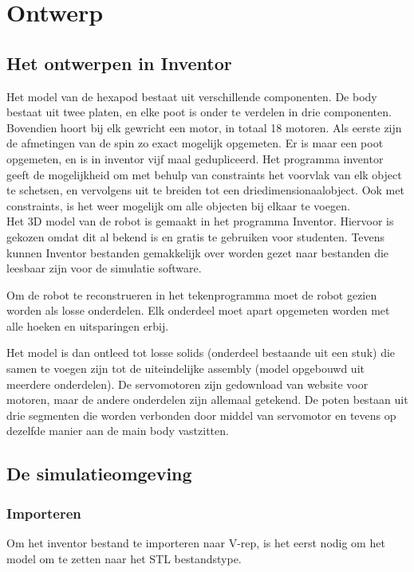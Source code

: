 \documentclass[10pt,a4paper]{article}
\begin{document}
\section{Ontwerp}
\subsection{Het ontwerpen in Inventor}
Het model van de hexapod bestaat uit verschillende componenten. De body bestaat uit twee platen, en elke poot is onder te verdelen in drie componenten. Bovendien hoort bij elk gewricht een motor, in totaal 18 motoren. Als eerste zijn de afmetingen van de spin zo exact mogelijk opgemeten. Er is maar een poot opgemeten, en is in inventor vijf maal gedupliceerd. Het programma inventor geeft de mogelijkheid om met behulp van constraints het voorvlak van elk object te schetsen, en vervolgens uit te breiden tot een driedimensionaalobject. Ook met constraints, is het weer mogelijk om alle objecten bij elkaar te voegen.\\

Het 3D model van de robot is gemaakt in het programma Inventor. Hiervoor is gekozen omdat dit al bekend is en gratis te gebruiken voor studenten. Tevens kunnen Inventor bestanden gemakkelijk over worden gezet naar bestanden die leesbaar zijn voor de simulatie software.
 
Om de robot te reconstrueren in het tekenprogramma moet de robot gezien worden als losse onderdelen. Elk onderdeel moet apart opgemeten worden met alle hoeken en uitsparingen erbij.

Het model is dan ontleed tot losse solids (onderdeel bestaande uit een stuk) die samen te voegen zijn tot de uiteindelijke assembly (model opgebouwd uit meerdere onderdelen).
De servomotoren zijn gedownload van website voor motoren, maar de andere onderdelen zijn allemaal getekend. De poten bestaan uit drie segmenten die worden verbonden door middel van servomotor en tevens op dezelfde manier aan de main body vastzitten. \\



\subsection{De simulatieomgeving}
\subsubsection{Importeren}
Om het inventor bestand te importeren naar V-rep, is het eerst nodig om het model om te zetten naar het STL bestandstype.
\end{document}
